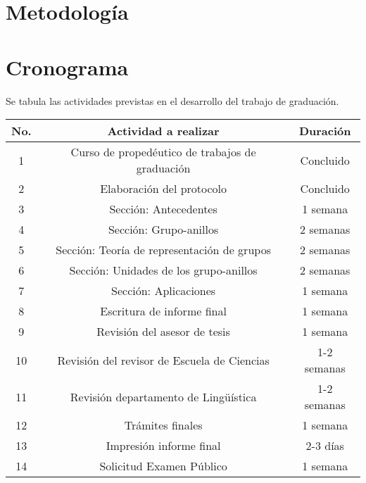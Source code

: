 \documentclass[12pt,letterpaper,titlepage]{article}
\begin{document}
\section{Metodología}


\newpage

\section{Cronograma}
Se tabula las actividades previstas en el desarrollo del trabajo de graduación.

\vspace{1cm}

\begin{tabular}{|c|c|c|}
  \hline
   \textbf{No.}  &  \textbf{Actividad a realizar} &  \textbf{Duración }\\ \hline
  1  & Curso de propedéutico de trabajos de graduación & Concluido \\
  2  & Elaboración del protocolo & Concluido \\
  3  & Sección: Antecedentes & 1 semana \\
  4  & Sección: Grupo-anillos & 2 semanas \\
  5  & Sección: Teoría de representación de grupos & 2 semanas \\
  6  & Sección: Unidades de los grupo-anillos & 2 semanas \\
  7  & Sección: Aplicaciones & 1 semana \\
  8  & Escritura de informe final & 1 semana \\
  9  & Revisión del asesor de tesis & 1 semana \\
  10 & Revisión del revisor de Escuela de Ciencias & 1-2 semanas \\
  11 & Revisión departamento de Lingüística & 1-2 semanas \\
  12 & Trámites finales & 1 semana  \\
  13 & Impresión informe final & 2-3 días \\
  14 & Solicitud Examen Público & 1 semana \\
  \hline
\end{tabular}
\end{document}

